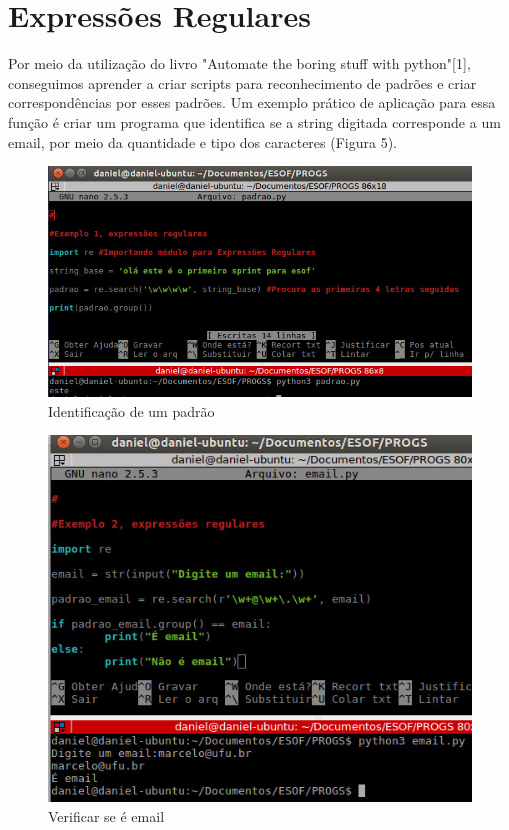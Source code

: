 \documentclass[12pt, a4paper, twocolumn]{article}
\begin{document}
\pagebreak

\section{Expressões Regulares}
Por meio da utilização do livro "Automate the boring stuff with python"[1], conseguimos aprender a criar scripts para reconhecimento de padrões e criar correspondências por esses padrões. Um exemplo prático de aplicação para essa função é criar um programa que identifica se a string digitada corresponde a um email, por meio da quantidade e tipo dos caracteres (Figura 5).
\begin{figure}[htb!]
	\centering
	\includegraphics[scale = 0.32] {re1.jpg}
	\caption{Identificação de um padrão}
\end{figure}

\begin{figure}[htb!]
	\centering
	\includegraphics[scale = 0.43] {re2.jpg}
	\caption{Verificar se é email}
\end{figure}
\end{document}
